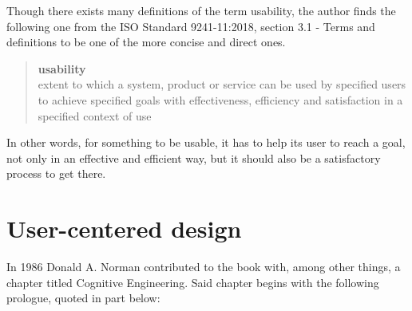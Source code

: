 
Though there exists many definitions of the term usability, the author finds the
following one from the ISO Standard 9241-11:2018\cite{citeISO9241}, section 3.1
- Terms and definitions to be one of the more concise and direct ones.
\begin{quote}
  \textbf{usability} \\
  extent to which a system, product or service can be used by specified users to
  achieve specified goals with effectiveness, efficiency and satisfaction in a
  specified context of use
\end{quote}

In other words, for something to be usable, it has to help its user to
reach a goal, not only in an effective and efficient way, but it should also be
a satisfactory process to get there.

%
%


\section{User-centered design}

In 1986 Donald A. Norman contributed to the book
\cite{citeUserCenteredNorman} with, among
other things, a chapter titled Cognitive Engineering\cite[p.
31]{citeUserCenteredNorman}. Said chapter begins with the following prologue,
quoted in part below:

